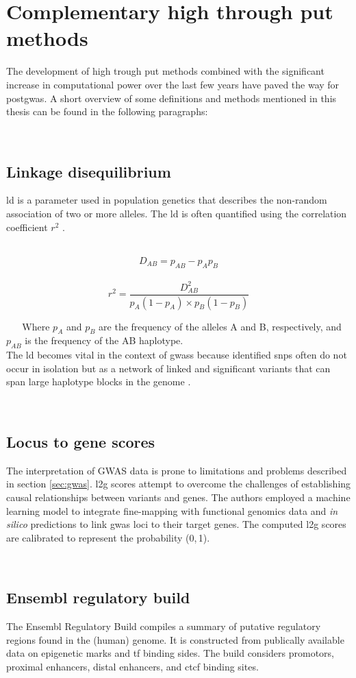    \section{Complementary high through put methods}
    \label{sec:bioinformatics}
    The development of high trough put methods combined with the significant increase in computational power over the last few years have paved the way for post\ac{gwas}. A short overview of some definitions and methods mentioned in this thesis can be found in the following paragraphs:

    \subsection{Linkage disequilibrium}
    \label{subsec:ld}
    \Ac{ld} is a parameter used in population genetics that describes the non-random association of two or more alleles. The \ac{ld} is often quantified using the correlation coefficient $r^2$ \cite{slatkinLinkageDisequilibriumUnderstanding2008}.

        $$ D_{AB} = p_{AB} − p_A p_B $$
        $$ r^2 = \frac{D_{AB}^2}{p_A (1-p_A) \times p_B (1-p_B)} $$

    Where $p_A$ and $p_B$ are the frequency of the alleles A and B, respectively, and $p_{AB}$ is the frequency of the AB haplotype.\\
    The \ac{ld} becomes vital in the context of \acp{gwas} because identified \acp{snp} often do not occur in isolation but as a network of linked and significant variants that can span large haplotype blocks in the genome \cite{slatkinLinkageDisequilibriumUnderstanding2008}.

    \subsection{Locus to gene scores}
    The interpretation of GWAS data is prone to limitations and problems described in section \ref{sec:gwas}. \Ac{l2g} scores attempt to overcome the challenges of establishing causal relationships between variants and genes. The authors employed a machine learning model to integrate fine-mapping with functional genomics data and \textit{in silico} predictions to link \ac{gwas} loci to their target genes. The computed \ac{l2g} scores are calibrated to represent the probability (0,\,1). \cite{mountjoyOpenApproachSystematically2021}

    \subsection{Ensembl regulatory build}
    The Ensembl Regulatory Build compiles a summary of putative regulatory regions found in the (human) genome. It is constructed from publically available data on epigenetic marks and \ac{tf} binding sides. The build considers promotors, proximal enhancers, distal enhancers, and \ac{ctcf} binding sites. \cite{zerbinoEnsemblRegulatoryBuild2015}

